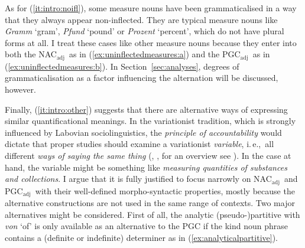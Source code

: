 \documentclass[USenglish]{article}
\newcommand{\ie}{i.\,e.,}
\newcommand{\Sub}[1]{\ensuremath{\mathrm{_{#1}}}}
\newcommand{\NACa}{NAC\Sub{adj}}
\newcommand{\PGCa}{PGC\Sub{adj}}
\begin{document}
As for (\ref{it:intro:noifl}), some measure nouns have been grammaticalised in a way that they always appear non-inflected.
They are typical measure nouns like \textit{Gramm} `gram', \textit{Pfund} `pound' or \textit{Prozent} `percent', which do not have plural forms at all.
I treat these cases like other measure nouns because they enter into both the \NACa\ as in (\ref{ex:uninflectedmeasures:a}) and the \PGCa\ as in (\ref{ex:uninflectedmeasures:b}).
In Section~\ref{sec:analyses}, degrees of grammaticalisation as a factor influencing the alternation will be discussed, however. 

\begin{exe}
  \ex\label{ex:uninflectedmeasures}
  \begin{xlist}
  \end{xlist}
\end{exe}

Finally, (\ref{it:intro:other}) suggests that there are alternative ways of expressing similar quantificational meanings.
In the variationist tradition, which is strongly influenced by Labovian sociolinguistics, the \textit{principle of accountability} would dictate that proper studies should examine a variationist \textit{variable}, \ie\ all different \textit{ways of saying the same thing} (\citealp{Labov1966}, \citealp{Labov1969}, for an overview see \citealp{Tagliamonte2012}).
In the case at hand, the variable might be something like \textit{measuring quantities of substances and collections}.
I argue that it is fully justified to focus narrowly on \NACa\ and \PGCa\ with their well-defined morpho-syntactic properties, mostly because the alternative constructions are not used in the same range of contexts.
Two major alternatives might be considered.
First of all, the analytic (pseudo-)partitive with \textit{von} `of' is only available as an alternative to the PGC if the kind noun phrase contains a (definite or indefinite) determiner as in (\ref{ex:analyticalpartitive}).
\end{document}
